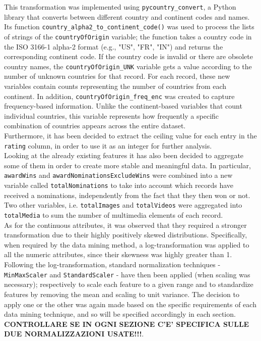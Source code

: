 This transformation was implemented using \texttt{pycountry\_convert}, a Python library that converts between different country and continent codes and names. 
Its function \texttt{country\_alpha2\_to\_continent\_code()} was used to process the lists of strings of the \texttt{countryOfOrigin} variable;
the function takes a country code in the ISO 3166-1 alpha-2 format (e.g., "US", "FR", "IN") and returns the corresponding continent code. 
If the country code is invalid or there are obsolete country names, the \texttt{countryOfOrigin\_UNK} variable gets a value according to the number of unknown countries for that record. 
For each record, these new variables contain counts representing the number of countries from each continent.
In addition, \texttt{countryOfOrigin\_freq\_enc} was created to capture frequency-based information. 
Unlike the continent-based variables that count individual countries, this variable represents how frequently a specific combination of countries appears across the entire dataset.\\
Furthermore, it has been decided to extract the ceiling value for each entry in the \texttt{rating} column, in order to use it as an integer for further analysis.\\
Looking at the already existing features it has also been decided to aggregate some of them in order to create more stable and meaningful data. 
In particular, \texttt{awardWins} and \texttt{awardNominationsExcludeWins} were combined into a new variable called \texttt{totalNominations} to take into account
which records have received a nominations, independently from the fact that they then won or not.
Two other variables, i.e. \texttt{totalImages} and \texttt{totalVideos} were aggregated into \texttt{totalMedia} to sum the number of multimedia elements
of each record.\\

As for the continuous attributes, it was observed that they required a stronger transformation due to their highly positively skewed distributions. 
Specifically, when required by the data mining method, a log-transformation was applied to all the numeric attributes, since their skewness was highly greater than 1. 
Following the log-transformation, standard normalization techniques - \texttt{MinMaxScaler} and \texttt{StandardScaler} - have then been applied (when scaling was necessary); 
respectively to scale each feature to a given range and to standardize features by removing the mean and scaling to unit variance.
The decision to apply one or the other was again made based on the specific requirements of each data mining technique, and so will be specified accordingly in each section.
\textbf{CONTROLLARE SE IN OGNI SEZIONE C'E' SPECIFICA SULLE DUE NORMALIZZAZIONI USATE!!!}.


